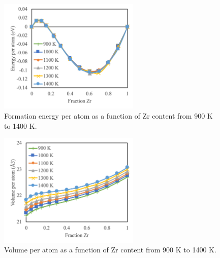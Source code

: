 \documentclass[review]{elsarticle}
\begin{document}
\begin{figure}[!htp]
\begin{center}
\includegraphics[width=0.6\textwidth]{Efperat}
\end{center}
\caption{Formation energy per atom as a function of Zr content from 900 K to 1400 K.  }
\label{fig:Efperat}
\end{figure}

\begin{figure}[!htp]
\begin{center}
\includegraphics[width=0.6\textwidth]{Vperat}
\end{center}
\caption{Volume per atom as a function of Zr content from 900 K to 1400 K.  }
\label{fig:Vperat}
\end{figure}

\FloatBarrier
\end{document}
